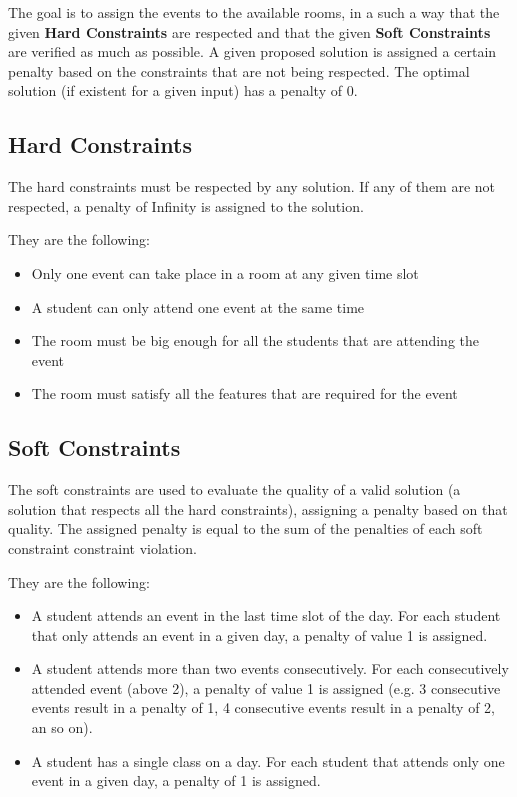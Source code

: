 \documentclass[conference]{IEEEtran}
\begin{document}
The goal is to assign the events to the available rooms, in a such a way that the given \textbf{Hard Constraints} are respected and that the given \textbf{Soft Constraints} are verified as much as possible. A given proposed solution is assigned a certain penalty based on the constraints that are not being respected. The optimal solution (if existent for a given input) has a penalty of 0.

\subsection{Hard Constraints}

The hard constraints must be respected by any solution. If any of them are not respected, a penalty of Infinity is assigned to the solution.

They are the following:

\begin{itemize}
    \item Only one event can take place in a room at any given time slot
    \item A student can only attend one event at the same time
    \item The room must be big enough for all the students that are attending the event
    \item The room must satisfy all the features that are required for the event
\end{itemize}

\subsection{Soft Constraints}

The soft constraints are used to evaluate the quality of a valid solution (a solution that respects all the hard constraints), assigning a penalty based on that quality. The assigned penalty is equal to the sum of the penalties of each soft constraint constraint violation.

They are the following: 

\begin{itemize}
    \item A student attends an event in the last time slot of the day. For each student that only attends an event in a given day, a penalty of value 1 is assigned.
    \item A student attends more than two events consecutively. For each consecutively attended event (above 2), a penalty of value 1 is assigned (e.g. 3 consecutive events result in a penalty of 1, 4 consecutive events result in a penalty of 2, an so on). 
    \item A student has a single class on a day. For each student that attends only one event in a given day, a penalty of 1 is assigned.
\end{itemize}
\end{document}
